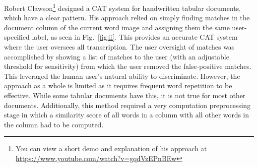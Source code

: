 \documentclass[ms]{byuprop}
\begin{document}
Robert Clawson\cite{Clawson2014}\footnote{You can view a short demo and explanation of his approach at \url{https://www.youtube.com/watch?v=gqdVzEPnBEw}} designed a CAT system for handwritten tabular documents, which have a clear pattern. His approach relied on simply finding matches in the document column of the current word image and assigning them the same user-specified label, as seen in Fig.~\ref{fig:ii}. This provides an accurate CAT system where the user oversees all transcription. The user oversight of matches was accomplished by showing a list of matches to the user (with an adjustable threshold for sensitivity) from which the user removed the false-positive matches. This leveraged the human user's natural ability to discriminate. However, the approach as a whole is limited as it requires frequent word repetition to be effective. While some tabular documents have this, it is not true for most other documents. Additionally, this method required a very computation preprocessing stage in which a similarity score of all words in a column with all other words in the column had to be computed.
\end{document}
